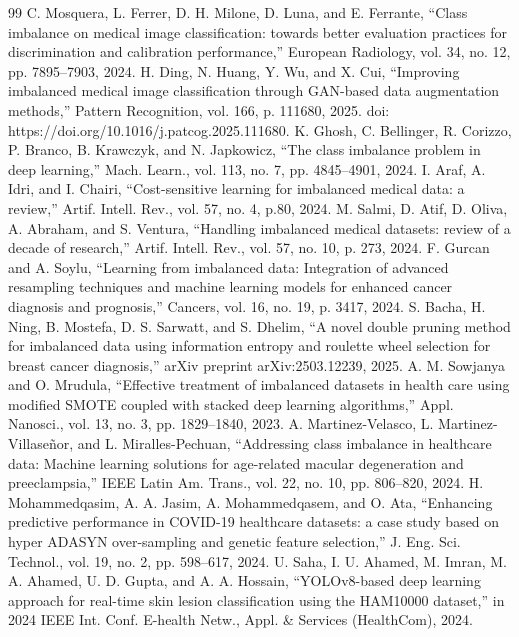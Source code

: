 \documentclass[final,5p,times,twocolumn,authoryear]{elsarticle}
\begin{document}
\begin{thebibliography}{99}
C. Mosquera, L. Ferrer, D. H. Milone, D. Luna, and E. Ferrante, “Class imbalance on medical image classification: towards better evaluation practices for discrimination and calibration performance,” European Radiology, vol. 34, no. 12, pp. 7895–7903, 2024.
H. Ding, N. Huang, Y. Wu, and X. Cui, “Improving imbalanced medical image classification through GAN-based data augmentation methods,” Pattern Recognition, vol. 166, p. 111680, 2025. doi: https://doi.org/10.1016/j.patcog.2025.111680.
K. Ghosh, C. Bellinger, R. Corizzo, P. Branco, B. Krawczyk, and N. Japkowicz, “The class imbalance problem in deep learning,” Mach. Learn., vol. 113, no. 7, pp. 4845–4901, 2024.
I. Araf, A. Idri, and I. Chairi, “Cost-sensitive learning for imbalanced medical data: a review,” Artif. Intell. Rev., vol. 57, no. 4, p.80, 2024.
M. Salmi, D. Atif, D. Oliva, A. Abraham, and S. Ventura, “Handling imbalanced medical datasets: review of a decade of research,” Artif. Intell. Rev., vol. 57, no. 10, p. 273, 2024.
F. Gurcan and A. Soylu, “Learning from imbalanced data: Integration of advanced resampling techniques and machine learning models for enhanced cancer diagnosis and prognosis,” Cancers, vol. 16, no. 19, p. 3417, 2024.
S. Bacha, H. Ning, B. Mostefa, D. S. Sarwatt, and S. Dhelim, “A novel double pruning method for imbalanced data using information entropy and roulette wheel selection for breast cancer diagnosis,” arXiv preprint arXiv:2503.12239, 2025.
A. M. Sowjanya and O. Mrudula, “Effective treatment of imbalanced datasets in health care using modified SMOTE coupled with stacked deep learning algorithms,” Appl. Nanosci., vol. 13, no. 3, pp. 1829–1840, 2023.
A. Martinez-Velasco, L. Martinez-Villaseñor, and L. Miralles-Pechuan, “Addressing class imbalance in healthcare data: Machine learning solutions for age-related macular degeneration and preeclampsia,” IEEE Latin Am. Trans., vol. 22, no. 10, pp. 806–820, 2024.
H. Mohammedqasim, A. A. Jasim, A. Mohammedqasem, and O. Ata, “Enhancing predictive performance in COVID-19 healthcare datasets: a case study based on hyper ADASYN over-sampling and genetic feature selection,” J. Eng. Sci. Technol., vol. 19, no. 2, pp. 598–617, 2024.
U. Saha, I. U. Ahamed, M. Imran, M. A. Ahamed, U. D. Gupta, and A. A. Hossain, “YOLOv8-based deep learning approach for real-time skin lesion classification using the HAM10000 dataset,” in 2024 IEEE Int. Conf. E-health Netw., Appl. & Services (HealthCom), 2024.

\end{thebibliography}
\end{document}
